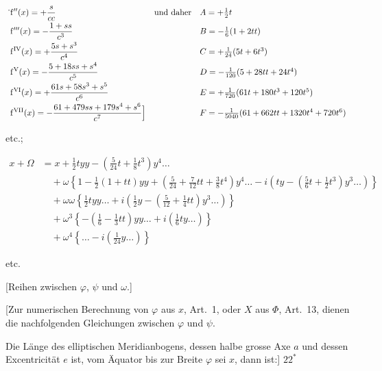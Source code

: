 \[
\begin{array}{ll@{\quad}l}
\displaystyle\rlap{\hspace{-.3em}\raisebox{1.2ex}{.}}\mathrm f''(x)=+\frac{s}{cc}&\text{und daher}&A=+\tfrac12t\\[6pt]
\displaystyle\mathrm f'''(x)=-\frac{1+ss}{c^3}&&B=-\tfrac16(1+2tt)\\[6pt]
\displaystyle\mathrm f^{\mathrm{IV}}(x)=+\frac{5s+s^3}{c^4}&&C=+\tfrac1{24}(5t+6t^3)\\[6pt]
\displaystyle\mathrm f^{\mathrm V}(x)=-\frac{5+18ss+s^4}{c^5}&&D=-\tfrac1{120}(5+28tt+24t^4)\\[6pt]
\displaystyle\mathrm f^{\mathrm{VI}}(x)=+\frac{61s+58s^3+s^5}{c^6}&&E=+\tfrac1{720}(61t+180t^3+120t^5)\\[6pt]
\displaystyle\mathrm f^{\mathrm{VII}}(x)=-\frac{61+479ss+179s^4+s^6}{c^7}\Big]&&F=-\tfrac1{5040}(61+662tt+1320t^4+720t^6)
\end{array}
\]
\begin{center}etc.;\end{center}
\par{}
\begingroup\footnotesize
\[
\begin{aligned}
x+\Omega&=x+\tfrac12tyy-(\tfrac5{24}t+\tfrac18t^3)y^4\ldots\\
&\quad+\omega\left\{1-\tfrac12(1+tt)yy+(\tfrac5{24}+\tfrac7{12}tt+\tfrac38t^4)y^4\ldots-i\left(ty-(\tfrac56t+\tfrac12t^3)y^3\ldots\right)\right\}\\
&\quad+\omega\omega\left\{\tfrac12tyy\ldots+i\left(\tfrac12y-(\tfrac5{12}+\tfrac14tt)y^3\ldots\right)\right\}\\
&\quad+\omega^3\left\{-(\tfrac16-\tfrac13tt)yy\ldots+i(\tfrac16ty\ldots)\right\}\\
&\quad+\omega^4\left\{\ldots-i(\tfrac1{24}y\ldots)\right\}
\end{aligned}
\]
\begin{center}etc.\end{center}
\par\endgroup
\bigskip
\begin{center}
[Reihen zwischen $\varphi$, $\psi$ und $\omega$.]\par\medskip
[21.]
\end{center}
[Zur numerischen Berechnung von $\varphi$ aus $x$, Art.~1, oder $X$ aus $\Phi$, Art.~13, dienen die nachfolgenden Gleichungen zwischen $\varphi$ und $\psi$.

Die Länge des elliptischen Meridianbogens, dessen halbe grosse Axe $a$ und dessen Excentricität $e$ ist, vom Äquator bis zur Breite $\varphi$ sei $x$, dann ist:]
\vfill\hfill$22^*$\hspace*{2cm}\par
\endgroup
